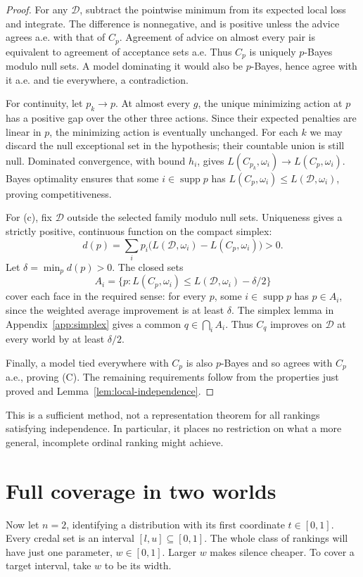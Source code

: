 \documentclass[11pt]{article}
\theoremstyle{remark}
\newcommand{\Dscr}{\mathcal D}
\newcommand{\supp}{\operatorname{supp}}
\begin{document}
\begin{proof}
For any $\Dscr$, subtract the pointwise minimum from its expected local loss
and integrate. The difference is nonnegative, and is positive unless the
advice agrees a.e. with that of $C_p$. Agreement of advice on almost every
pair is equivalent to agreement of acceptance sets a.e. Thus $C_p$ is uniquely
$p$-Bayes modulo null sets. A model dominating it would also be $p$-Bayes,
hence agree with it a.e. and tie everywhere, a contradiction.

For continuity, let $p_k\to p$. At almost every $g$, the unique minimizing
action at $p$ has a positive gap over the other three actions. Since their
expected penalties are linear in $p$, the minimizing action is eventually
unchanged. For each $k$ we may discard the null exceptional set in the
hypothesis; their countable union is still null. Dominated convergence, with
bound $h_i$, gives $L(C_{p_k},\omega_i)\to L(C_p,\omega_i)$.
Bayes optimality ensures that some $i\in\supp p$ has
$L(C_p,\omega_i)\le L(\Dscr,\omega_i)$, proving competitiveness.

For (c), fix $\Dscr$ outside the selected family modulo null sets. Uniqueness
gives a strictly positive, continuous function on the compact simplex:
\[
 d(p)=\sum_i p_i\bigl(L(\Dscr,\omega_i)-L(C_p,\omega_i)\bigr)>0.
\]
Let $\delta=\min_pd(p)>0$. The closed sets
\[
 A_i=\{p:L(C_p,\omega_i)\le L(\Dscr,\omega_i)-\delta/2\}
\]
cover each face in the required sense: for every $p$, some $i\in\supp p$
has $p\in A_i$, since the weighted average improvement is at least $\delta$.
The simplex lemma in Appendix~\ref{app:simplex} gives a common $q\in\bigcap_iA_i$.
Thus $C_q$ improves on $\Dscr$ at every world by at least $\delta/2$.

Finally, a model tied everywhere with $C_p$ is also $p$-Bayes and so agrees
with $C_p$ a.e., proving (C). The remaining requirements follow from the
properties just proved and Lemma~\ref{lem:local-independence}.
\end{proof}

This is a sufficient method, not a representation theorem for all rankings
satisfying independence. In particular, it places no restriction on what a
more general, incomplete ordinal ranking might achieve.

\section{Full coverage in two worlds}

Now let $n=2$, identifying a distribution with its first coordinate
$t\in[0,1]$. Every credal set is an interval $[l,u]\subseteq[0,1]$.
The whole class of rankings will have just one parameter, $w\in[0,1]$.
Larger $w$ makes silence cheaper. To cover a target interval, take $w$ to be
its width.
\end{document}
